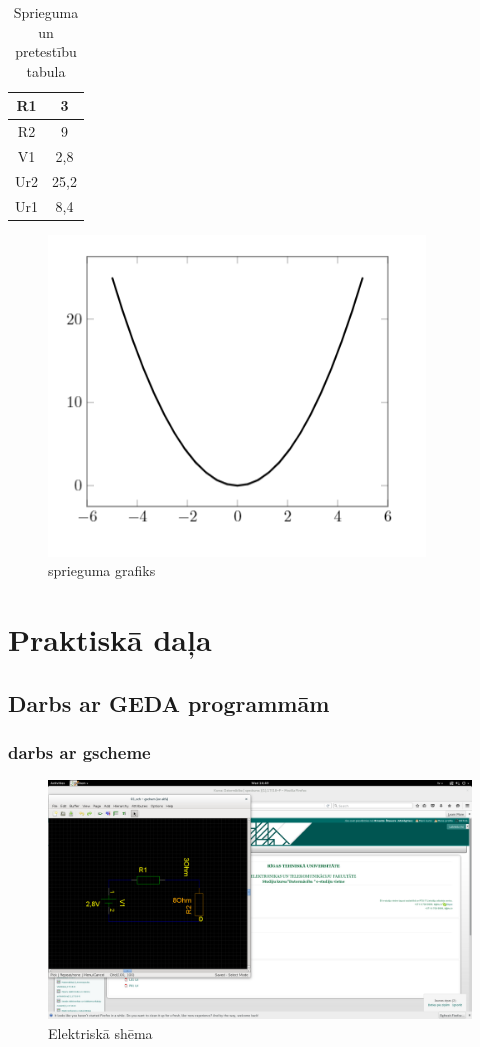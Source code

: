 \documentclass{report}
\begin{document}
\begin{table}
\begin{tabular}{|c|c|}
\hline
   R1  & 3 \\
   \hline
    R2 & 9 \\
    \hline
    V1 & 2,8 \\
    \hline
    Ur2 & 25,2 \\
    \hline
    Ur1 & 8,4 \\
    \hline
\end{tabular}
\begin{centering}
\caption{Sprieguma un pretestību tabula}
\end{centering}
\end{table}
\newpage
\begin{figure}
    \centering
    \includegraphics[width=10cm]{grafiks.png}
    \caption{sprieguma grafiks}
\end{figure}


\chapter{Praktiskā daļa}
\section{Darbs ar GEDA programmām}
\subsection{darbs ar gscheme}

\begin{figure}[!h]
\includegraphics[width=\textwidth]{shema.png}
\caption{Elektriskā shēma}

\end{figure}
\newpage
\end{document}
